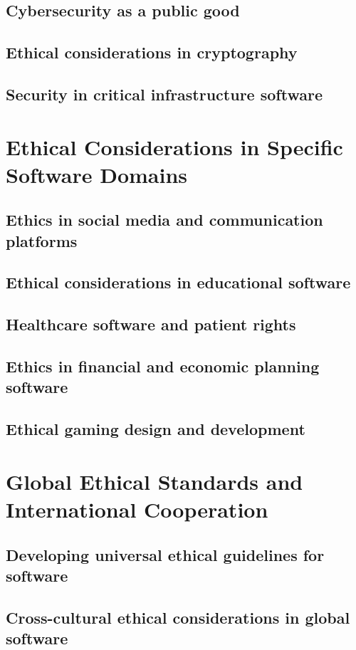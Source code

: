 \subsection{Cybersecurity as a public good}
\subsection{Ethical considerations in cryptography}
\subsection{Security in critical infrastructure software}

\newpage

\section{Ethical Considerations in Specific Software Domains}
\subsection{Ethics in social media and communication platforms}
\subsection{Ethical considerations in educational software}
\subsection{Healthcare software and patient rights}
\subsection{Ethics in financial and economic planning software}
\subsection{Ethical gaming design and development}

\newpage

\section{Global Ethical Standards and International Cooperation}
\subsection{Developing universal ethical guidelines for software}
\subsection{Cross-cultural ethical considerations in global software}
